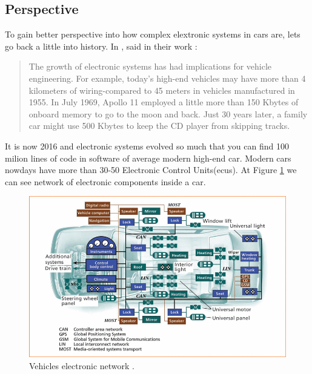 \subsection{Perspective} %
\label{sub:perspective}
To gain better perspective into how complex elextronic systems in cars are, lets go back a little into history. In \citeyear{976923}, \citeauthor{976923} said in their work :
\blockquote[\cite{976923}]{The growth of electronic systems has had implications for vehicle engineering. For example, today's high-end vehicles may have more than 4 kilometers of wiring-compared to 45 meters in vehicles manufactured in 1955. In July 1969, Apollo 11 employed a little more than 150 Kbytes of onboard memory to go to the moon and back. Just 30 years later, a family car might use 500 Kbytes to keep the CD player from skipping tracks.}
It is now 2016 and electronic systems evolved so much that you can find 100 milion lines of code in software of average modern high-end car\cite{lines_of_code}. Modern cars nowdays have more than 30-50 Electronic Control Units(\glspl{ecu}). At Figure \ref{fig:car_system} we can see network of electronic components inside a car.
\begin{figure}[H]
\begin{center}
\captionsetup{font=small}
\includegraphics[scale=0.5]{pics/car_system.png}
\caption{Vehicles electronic network \cite{976923}.}
\label{fig:car_system}
\end{center}
\end{figure}
